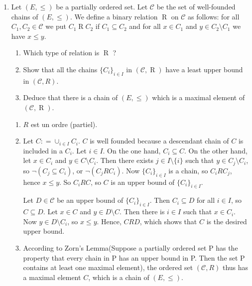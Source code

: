 \documentclass[a4paper,11pt]{exam}
\begin{document}
\begin{questions}
	
	\question
	\begin{enumerate}
		\item Let $ (E, \leq) $ be a partially ordered set. Let $ \mathcal{C} $ be the set of well-founded chains of $ (E, \leq) $. We define a binary relation $ \mathrel{R} $ on $ \mathcal{C} $ as follows: for all $ C_1, C_2 \in \mathcal{C} $ we put $ C_1 \mathrel{R} C_2 $ if $ C_1 \subseteq C_2 $ and for all $ x \in C_1 $ and $ y \in C_2 \setminus C_1 $ we have $ x \leq y $.
		\begin{enumerate}
			\item Which type of relation is $\mathrel{R}$ ?
			
			\item Show that all the chains $\{C_i\}_{i \in I}$ in $(\mathcal{C},\mathrel{R})$ have a least upper bound in $(\mathcal{C},R)$.
			
			\item Deduce that there is a chain of $(E,\leq)$ which is a maximal element of $(\mathcal{C},\mathrel{R})$.
		\end{enumerate}
		
		\begin{solution}
			\begin{enumerate}
				\item $R$ est un ordre (partiel).
				
				\item Let $ C: = \cup_ {i \in I} C_i$. $ C $ is well founded because a descendant chain of $C$ is included in a $C_i$. Let $ i \in I $. On the one hand, $ C_i \subseteq C $. On the other hand, let $ x \in C_i $ and $ y \in C \setminus C_i $. Then there exists $ j \in I \setminus \{i \} $ such that $ y \in C_j \setminus C_i $, so $ \neg (C_j \subseteq C_i) $, or $ \neg (C_j R C_i) $. Now $ \{C_i \} _ {i \in I} $ is a chain, so $ C_i R C_j $, hence $ x \leq y $. So $ C_iRC $, so $ C $ is an upper bound of $ \{C_i \}_{i \in I} $.
				
				Let $ D \in \mathcal {C} $ be an upper bound of $ \{C_i \}_{i \in I} $. Then $ C_i \subseteq D $ for all $ i \in I $, so $ C \subseteq D $. Let $ x \in C $ and $ y \in D \setminus C $. Then there is $ i \in I $ such that $ x \in C_i $. Now $ y \in D \setminus C_i $, so $ x \leq y $. Hence, $ C R D $, which shows that $ C $ is the desired upper bound.
				
				
				
				\item According to Zorn's Lemma(Suppose a partially ordered set P has the property that every chain in P has an upper bound in P. Then the set P contains at least one maximal element), the ordered set $ (\mathcal{C}, R) $ thus has a maximal element $ C $, which is a chain of $ (E, \leq) $.
			\end{enumerate}
			

\end{solution}
\end{enumerate}
\end{questions}
\end{document}

